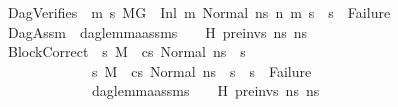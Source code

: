 \begin{isabellebody}
\ \ \ DagVerifies{\isacharcolon}{\kern0pt}\ {\isachardoublequoteopen}{\isasymAnd}\ m{}{\isacharprime}{\kern0pt}\ s{}{\isacharprime}{\kern0pt}{\isachardot}{\kern0pt}\ {\isacharparenleft}{\kern0pt}M{\isacharcomma}{\kern0pt}{\isasymLambda}{\isacharcomma}{\kern0pt}{\isasymGamma}{\isacharcomma}{\kern0pt}{\isasymOmega}{\isacharcomma}{\kern0pt}G{}\ {\isasymturnstile}\ {\isacharparenleft}{\kern0pt}Inl\ m{}{\isacharcomma}{\kern0pt}\ Normal\ ns{}{\isacharparenright}{\kern0pt}\ {\isacharminus}{\kern0pt}n{\isasymrightarrow}{\isacharasterisk}{\kern0pt}\ {\isacharparenleft}{\kern0pt}m{}{\isacharprime}{\kern0pt}{\isacharcomma}{\kern0pt}\ s{}{\isacharprime}{\kern0pt}{\isacharparenright}{\kern0pt}{\isacharparenright}{\kern0pt}\ {\isasymLongrightarrow}\ s{}{\isacharprime}{\kern0pt}\ {\isasymnoteq}\ Failure{\isachardoublequoteclose}\ \isanewline
\ \ \ DagAssm{\isacharcolon}{\kern0pt}\ \ {\isachardoublequoteopen}dag{\isacharunderscore}{\kern0pt}lemma{\isacharunderscore}{\kern0pt}assms\ {\isasymLambda}\ {\isasymGamma}\ {\isasymOmega}\ H\ pre{\isacharunderscore}{\kern0pt}invs\ ns{}\ ns{}{\isachardoublequoteclose}\ \isanewline
\ \ \ BlockCorrect{\isacharcolon}{\kern0pt}\ {\isachardoublequoteopen}{\isasymAnd}\ s{}{\isacharprime}{\kern0pt}{\isacharprime}{\kern0pt}{\isachardot}{\kern0pt}\ M{\isacharcomma}{\kern0pt}{\isasymLambda}{\isacharcomma}{\kern0pt}{\isasymGamma}{\isacharcomma}{\kern0pt}{\isasymOmega}\ {\isasymturnstile}\ {\isasymlangle}cs{}{\isacharcomma}{\kern0pt}\ Normal\ ns{}{\isasymrangle}\ {\isacharbrackleft}{\kern0pt}{\isasymrightarrow}{\isacharbrackright}{\kern0pt}\ s{}{\isacharprime}{\kern0pt}{\isacharprime}{\kern0pt}\ {\isasymLongrightarrow}\isanewline
\ \ \ \ \ \ \ \ \ \ \ \ \ \ \ {\isacharparenleft}{\kern0pt}{\isasymAnd}s{}{\isacharprime}{\kern0pt}{\isachardot}{\kern0pt}\ {\isacharparenleft}{\kern0pt}M{\isacharcomma}{\kern0pt}{\isasymLambda}{\isacharcomma}{\kern0pt}{\isasymGamma}{\isacharcomma}{\kern0pt}{\isasymOmega}\ {\isasymturnstile}\ {\isasymlangle}cs{}{\isacharcomma}{\kern0pt}\ Normal\ ns{}{\isasymrangle}\ {\isacharbrackleft}{\kern0pt}{\isasymrightarrow}{\isacharbrackright}{\kern0pt}\ s{}{\isacharprime}{\kern0pt}{\isacharparenright}{\kern0pt}\ {\isasymLongrightarrow}\ s{}{\isacharprime}{\kern0pt}\ {\isasymnoteq}\ Failure{\isacharparenright}{\kern0pt}\ {\isasymLongrightarrow}\isanewline
\ \ \ \ \ \ \ \ \ \ \ \ \ \ \ dag{\isacharunderscore}{\kern0pt}lemma{\isacharunderscore}{\kern0pt}assms\ {\isasymLambda}\ {\isasymGamma}\ {\isasymOmega}\ H\ pre{\isacharunderscore}{\kern0pt}invs\ ns{}\ ns{}\ \ {\isasymLongrightarrow}\ \ \ \ \ \ \isanewline

\end{isabellebody}
